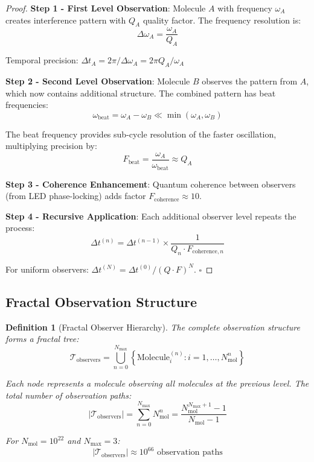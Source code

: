 \documentclass[12pt,a4paper]{article}
\newtheorem{definition}[theorem]{Definition}
\begin{document}
\begin{proof}
\textbf{Step 1 - First Level Observation}:
Molecule $A$ with frequency $\omega_A$ creates interference pattern with $Q_A$ quality factor. The frequency resolution is:
\begin{equation}
\Delta \omega_A = \frac{\omega_A}{Q_A}
\end{equation}

Temporal precision: $\Delta t_A = 2\pi/\Delta\omega_A = 2\pi Q_A/\omega_A$

\textbf{Step 2 - Second Level Observation}:
Molecule $B$ observes the pattern from $A$, which now contains additional structure. The combined pattern has beat frequencies:
\begin{equation}
\omega_{\text{beat}} = \omega_A - \omega_B \ll \min(\omega_A, \omega_B)
\end{equation}

The beat frequency provides sub-cycle resolution of the faster oscillation, multiplying precision by:
\begin{equation}
F_{\text{beat}} = \frac{\omega_A}{\omega_{\text{beat}}} \approx Q_A
\end{equation}

\textbf{Step 3 - Coherence Enhancement}:
Quantum coherence between observers (from LED phase-locking) adds factor $F_{\text{coherence}} \approx 10$.

\textbf{Step 4 - Recursive Application}:
Each additional observer level repeats the process:
\begin{equation}
\Delta t^{(n)} = \Delta t^{(n-1)} \times \frac{1}{Q_n \cdot F_{\text{coherence},n}}
\end{equation}

For uniform observers: $\Delta t^{(N)} = \Delta t^{(0)} / (Q \cdot F)^N$. $\square$
\end{proof}

\subsection{Fractal Observation Structure}

\begin{definition}[Fractal Observer Hierarchy]
The complete observation structure forms a fractal tree:
\begin{equation}
\mathcal{T}_{\text{observers}} = \bigcup_{n=0}^{N_{\text{max}}} \left\{\text{Molecule}_i^{(n)} : i = 1, \ldots, N_{\text{mol}}^n\right\}
\end{equation}

Each node represents a molecule observing all molecules at the previous level. The total number of observation paths:
\begin{equation}
|\mathcal{T}_{\text{observers}}| = \sum_{n=0}^{N_{\text{max}}} N_{\text{mol}}^n = \frac{N_{\text{mol}}^{N_{\text{max}}+1} - 1}{N_{\text{mol}} - 1}
\end{equation}

For $N_{\text{mol}} = 10^{22}$ and $N_{\text{max}} = 3$:
\begin{equation}
|\mathcal{T}_{\text{observers}}| \approx 10^{66} \text{ observation paths}
\end{equation}
\end{definition}
\end{document}
